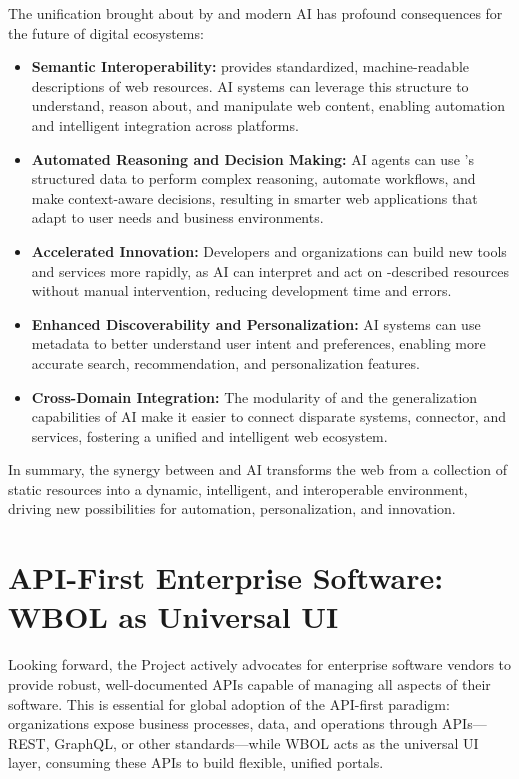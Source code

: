 The unification brought about by \wbol{} and modern AI has profound consequences for the future of digital ecosystems:
\begin{itemize}
	\item \textbf{Semantic Interoperability:} \wbol{} provides standardized, machine-readable descriptions of web resources. AI systems can leverage this structure to understand, reason about, and manipulate web content, enabling automation and intelligent integration across platforms.
	\item \textbf{Automated Reasoning and Decision Making:} AI agents can use \wbol{}'s structured data to perform complex reasoning, automate workflows, and make context-aware decisions, resulting in smarter web applications that adapt to user needs and business environments.
	\item \textbf{Accelerated Innovation:} Developers and organizations can build new tools and services more rapidly, as AI can interpret and act on \wbol{}-described resources without manual intervention, reducing development time and errors.
	\item \textbf{Enhanced Discoverability and Personalization:} AI systems can use \wbol{} metadata to better understand user intent and preferences, enabling more accurate search, recommendation, and personalization features.
	\item \textbf{Cross-Domain Integration:} The modularity of \wbol{} and the generalization capabilities of AI make it easier to connect disparate systems, connector, and services, fostering a unified and intelligent web ecosystem.
\end{itemize}

In summary, the synergy between \wbol{} and AI transforms the web from a collection of static resources into a dynamic, intelligent, and interoperable environment, driving new possibilities for automation, personalization, and innovation.

\section{API-First Enterprise Software: WBOL as Universal UI}

Looking forward, the Project actively advocates for enterprise software vendors to provide robust, well-documented APIs capable of managing all aspects of their software. This is essential for global adoption of the API-first paradigm: organizations expose business processes, data, and operations through APIs—REST, GraphQL, or other standards—while WBOL acts as the universal UI layer, consuming these APIs to build flexible, unified portals.

